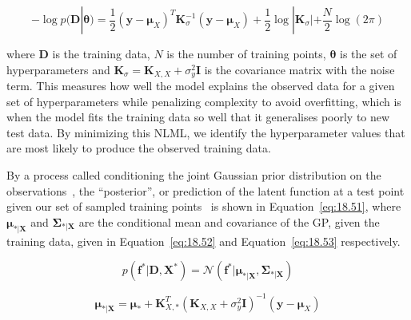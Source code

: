 \documentclass[12pt]{article}
\begin{document}
    \begin{equation}
        -\log p(\mathbf{D}|\boldsymbol{\theta}) = \frac{1}{2} (\mathbf{y} - \boldsymbol{\mu}_X)^T \mathbf{K}_{\sigma}^{-1} (\mathbf{y} - \boldsymbol{\mu}_X) + \frac{1}{2} \log |\mathbf{K}_{\sigma}| + \frac{N}{2} \log(2\pi)\label{eq:NLML}
    \end{equation}


    where $\mathbf{D}$ is the training data, $N$ is the number of training points, $\boldsymbol{\theta}$ is the set of hyperparameters and $\mathbf{K}_{\sigma} = \mathbf{K}_{X,X} + \sigma^2_y \mathbf{I}$ is the covariance matrix with the noise term.
    This measures how well the model explains the observed data for a given set of hyperparameters while penalizing complexity to avoid overfitting, which is when the model fits the training data so well that it generalises poorly to new test data.
    By minimizing this NLML, we identify the hyperparameter values that are most likely to produce the observed training data.


    By a process called conditioning the joint Gaussian prior distribution on the observations~\cite{rasmussen2006gaussian}, the ``posterior'', or prediction of the latent function at a test point given our set of sampled training points~\cite{murphy2023probabilistic} is shown in Equation~\ref{eq:18.51}, where $\boldsymbol{\mu}_{*\vert \mathbf{X}}$ and $\boldsymbol{\Sigma}_{*\vert \mathbf{X}}$ are the conditional mean and covariance of the GP, given the training data, given in Equation~\ref{eq:18.52} and Equation~\ref{eq:18.53} respectively.

    \begin{equation}
        p(\mathbf{f}^* \vert \mathbf{D}, \mathbf{X}^*) = \mathcal{N}(\mathbf{f}^* \vert \boldsymbol{\mu}_{*\vert \mathbf{X}}, \boldsymbol{\Sigma}_{*\vert \mathbf{X}})\label{eq:18.51}
    \end{equation}

    \begin{equation}
        \boldsymbol{\mu}_{*\vert \mathbf{X}} = \boldsymbol{\mu}_* + \mathbf{K}_{X,*}^T (\mathbf{K}_{X,X} + \sigma^2_y \mathbf{I})^{-1} (\mathbf{y} - \boldsymbol{\mu}_X)\label{eq:18.52}
    \end{equation}
\end{document}
